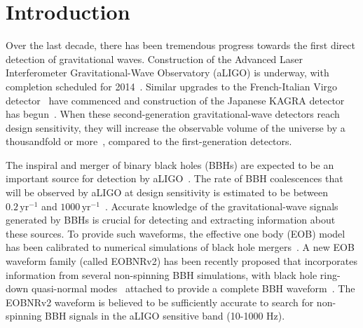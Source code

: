
\section{Introduction}
Over the last decade, there has been tremendous progress towards the
first direct detection of gravitational waves. Construction of the Advanced
Laser Interferometer Gravitational-Wave Observatory (aLIGO) is underway, with
completion scheduled for 2014~\cite{Harry:2010zz}. Similar upgrades to
the French-Italian Virgo detector~\cite{aVIRGO} have commenced and construction
of the Japanese KAGRA detector has begun~\cite{Somiya:2011np}.  When these
second-generation gravitational-wave detectors reach design sensitivity, they
will increase the observable volume of the universe by a thousandfold or
more~\cite{aLIGOsensitivity}, compared to the first-generation detectors.

The inspiral and merger of binary black holes (BBHs) are expected to be an important source for detection by
aLIGO~\cite{300yrsofGravitation}.  The rate of BBH coalescences that will be
observed by aLIGO at design sensitivity is estimated to be between
$0.2\,\mathrm{yr}^{-1}$ and $1000\,\mathrm{yr}^{-1}$~\cite{LSCCBCRates2010}.
Accurate knowledge of the gravitational-wave signals generated by BBHs is
crucial for detecting and extracting information about these sources.  
To provide such waveforms, the effective one body (EOB)
model~\cite{EOBOriginalBuonannoDamour} has been calibrated to numerical
simulations of black hole
mergers~\cite{EOBNR01,EOBNRdevel01,EOBNRdevel02,EOBNRdevel03,EOBNRdevel04,EOBdevel01,EOBdevel02,BuonannoEOBv2Main}.
A new EOB waveform family (called EOBNRv2) has been recently proposed that
incorporates information from several non-spinning BBH simulations, with black
hole ring-down quasi-normal modes~\cite{BHRDQNMs,BHPTMinoSasaki} attached to
provide a complete BBH waveform~\cite{BuonannoEOBv2Main}.  The EOBNRv2
waveform is believed to be sufficiently accurate to search for non-spinning
BBH signals in the aLIGO sensitive band (10-1000 Hz). 

